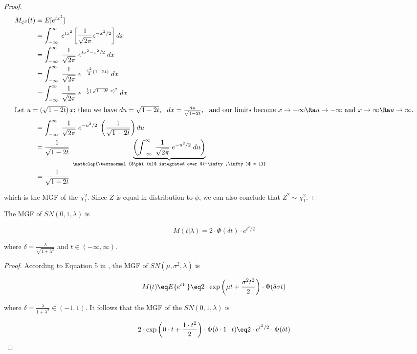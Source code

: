 \documentclass{article}
\begin{document}
\begin{proof}
  \begin{align*}
    M_{\phi^2}(t) &= E[e^{tx^2}] \\
    &= \int_{-\infty}^\infty \; e^{tx^2} \left[ \frac{1}{\sqrt{2\pi}} e^{-x^2/2} \right] dx \\
    &= \int_{-\infty}^\infty \; \frac{1}{\sqrt{2\pi}} \; e^{tx^2 - x^2/2} \; dx \\
    &= \int_{-\infty}^\infty \; \frac{1}{\sqrt{2\pi}} \; e^{-\frac{x^2}{2}(1 - 2t)} \; dx \\
    &= \int_{-\infty}^\infty \; \frac{1}{\sqrt{2\pi}} \; e^{-\frac{1}{2}(\sqrt{1-2t} \; x)^2} \; dx \\
    \intertext{Let $u = (\sqrt{1-2t}) \, x$; then we have $du = \sqrt{1-2t}$, \enspace $dx = \frac{du}{\sqrt{1-2t}}$, \enspace and our limits become $x \to -\infty \Ra u \to -\infty$
      and $x \to \infty \Ra u \to \infty$.}
    &= \int_{-\infty}^\infty \; \frac{1}{\sqrt{2\pi}} \; e^{-u^2/2} \; \left( \frac{1}{\sqrt{1-2t}} \right) du \\
    &= \frac{1}{\sqrt{1-2t}} \; \underbrace{\left( \int_{-\infty}^\infty \; \frac{1}{\sqrt{2\pi}} \; e^{-u^2/2} \; du \right)}_{\mathclap{\textnormal{$\phi(u)$ integrated over
      $(-\infty,\infty)$ = 1}}} \label{phi-pdf} \\
    &= \frac{1}{\sqrt{1-2t}}
  \end{align*}

  which is the MGF of the $\chi^2_1$. Since $Z$ is equal in distribution to
  $\phi$, we can also conclude that $Z^2 \sim \chi^2_1$. \end{proof}

\begin{property} \label{prop:4}
  The MGF of $SN(0,1,\lambda)$ is

  \begin{equation} \label{eq:p4-sn-mgf}
    M(t|\lambda) = 2 \cdot \Phi (\delta t) \cdot e^{t^2/2}
  \end{equation}
    
  where $\delta = \frac{\lambda}{\sqrt{1 + \lambda^2}}$ and $t \in (-\infty, \infty)$.
\end{property}

\begin{proof}
  According to Equation 5 in \citet{azzalini}, the MGF of $SN(\mu, \sigma^2,
  \lambda)$ is

  \begin{equation*}
    M(t) \eq E\{e^{tY}\} \eq 2 \cdot \exp \left( \mu t + \frac{\sigma^2 t^2}{2} \right) \cdot \Phi(\delta \sigma t)
  \end{equation*}

  where $\delta = \frac{\lambda}{1 + \lambda^2} \in (-1, 1)$. It follows that
  the MGF of the $SN(0, 1, \lambda)$ is

  \begin{equation*}
    2 \cdot \exp \left( 0 \cdot t + \frac{1 \cdot t^2}{2} \right) \cdot \Phi(\delta \cdot 1 \cdot t) \eq 2 \cdot e^{t^2/2} \cdot \Phi(\delta t)
  \end{equation*}
\end{proof}



\end{document}
